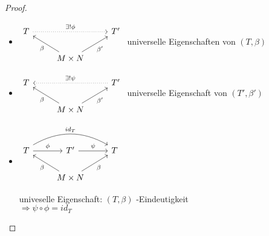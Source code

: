 \documentclass[../main.tex]{subfiles}
\begin{document}
\begin{proof} $ $
    \begin{itemize}
        \item $%
\begin{tikzcd}
T \arrow[rr, "\exists ! \phi", dotted] &                                                     & T' \\
                                       & M\times N \arrow[lu, "\beta"] \arrow[ru, "\beta'"'] &   
\end{tikzcd}$ universelle Eigenschaften von $(T,\beta)$
        \item
        $%
\begin{tikzcd}
T &                                                     & T' \arrow[ll, "\exists ! \psi"', dotted] \\
  & M\times N \arrow[lu, "\beta"] \arrow[ru, "\beta'"'] &                                         
\end{tikzcd}$ universelle Eigenschaft von $(T',\beta')$
        \item $%
\begin{tikzcd}
T \arrow[r, "\phi"] \arrow[rr, "id_T", bend left, shift left] & T' \arrow[r, "\psi"]                               & T \\
& M\times N \arrow[ru, "\beta"'] \arrow[lu, "\beta"] &  
\end{tikzcd}$ \begin{minipage}{0.5\textwidth}
    univeselle Eigenschaft: $(T,\beta)$ -Eindeutigkeit\\ $\Rightarrow \psi\circ \phi = id_T$
\end{minipage}

\end{itemize}
\end{proof}
\end{document}
